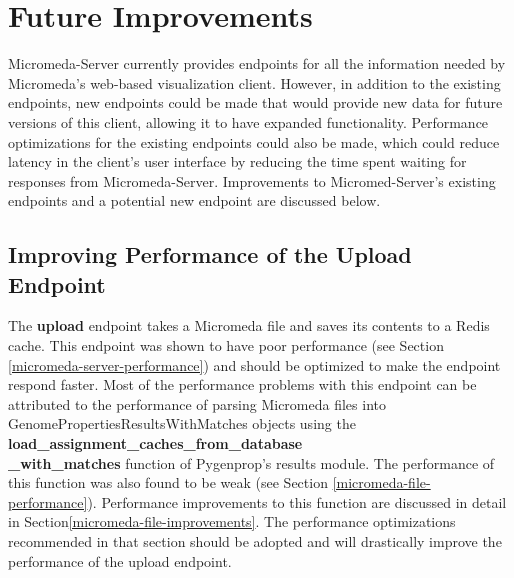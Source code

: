 \section{Future Improvements} \label{micromeda-server-improvements}

Micromeda-Server currently provides endpoints for all the information needed by Micromeda's web-based visualization client. However, in addition to the existing endpoints, new endpoints could be made that would provide new data for future versions of this client, allowing it to have expanded functionality. Performance optimizations for the existing endpoints could also be made, which could reduce latency in the client's user interface by reducing the time spent waiting for responses from Micromeda-Server. Improvements to Micromed-Server's existing endpoints and a potential new endpoint are discussed below.

\subsection{Improving Performance of the Upload Endpoint}

The \textbf{upload} endpoint takes a Micromeda file and saves its contents to a Redis cache. This endpoint was shown to have poor performance (see Section \ref{micromeda-server-performance}) and should be optimized to make the endpoint respond faster. Most of the performance problems with this endpoint can be attributed to the performance of parsing Micromeda files into GenomePropertiesResultsWithMatches objects using the \textbf{load\_assignment\_caches\_from\_database \\ \_with\_matches} function of Pygenprop's results module. The performance of this function was also found to be weak (see Section \ref{micromeda-file-performance}). Performance improvements to this function are discussed in detail in Section\ref{micromeda-file-improvements}. The performance optimizations recommended in that section should be adopted and will drastically improve the performance of the upload endpoint. 


